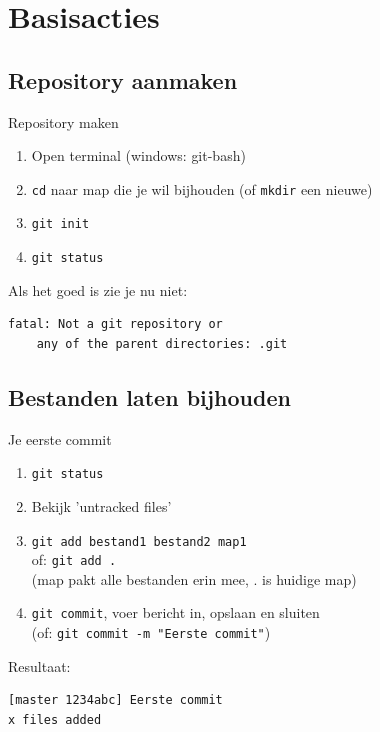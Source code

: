\section{Basisacties}

\subsection{Repository aanmaken}
\begin{frame}[fragile]{Repository maken}
	\begin{enumerate}
		\item Open terminal (windows: \alert{git-bash})
		\item \texttt{cd} naar map die je wil bijhouden
			(of \texttt{mkdir} een nieuwe)
		\item \texttt{git init}
		\item \texttt{git status}
	\end{enumerate}
	Als het goed is zie je nu \alert{niet}:
	\begin{verbatim}
fatal: Not a git repository or 
	any of the parent directories: .git
	\end{verbatim}
\end{frame}

\subsection{Bestanden laten bijhouden}
\begin{frame}[fragile]{Je eerste commit}
	\begin{enumerate}
		\item \texttt{git status}
		\item Bekijk 'untracked files'
		\item \texttt{git add bestand1 bestand2 map1}\\ of:
			\texttt{git add .}\\
			(map pakt alle bestanden erin mee, . is huidige map)
		\item \texttt{git commit}, voer bericht in, opslaan en sluiten\\
			(of: \texttt{git commit -m "Eerste commit"})
	\end{enumerate}
	Resultaat: 
	\begin{verbatim}
[master 1234abc] Eerste commit
x files added
	\end{verbatim}
\end{frame}

